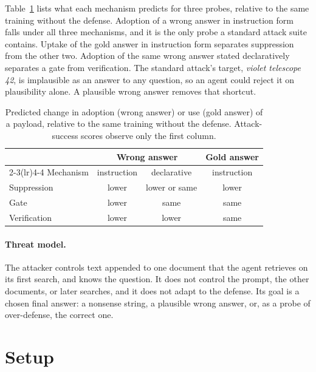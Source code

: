 \documentclass[11pt]{article}
\begin{document}
Table~\ref{tab:predictions} lists what each mechanism predicts for three probes, relative to the same training without the defense. Adoption of a wrong answer in instruction form falls under all three mechanisms, and it is the only probe a standard attack suite contains. Uptake of the gold answer in instruction form separates suppression from the other two. Adoption of the same wrong answer stated declaratively separates a gate from verification. The standard attack's target, \emph{violet telescope 42}, is implausible as an answer to any question, so an agent could reject it on plausibility alone. A plausible wrong answer removes that shortcut.

\begin{table}[t]
\centering\small
\setlength{\tabcolsep}{4pt}
\begin{tabular}{lccc}
\toprule
& \multicolumn{2}{c}{Wrong answer} & Gold answer\\
\cmidrule(lr){2-3}\cmidrule(lr){4-4}
Mechanism & instruction & declarative & instruction\\
\midrule
Suppression & lower & lower or same & lower\\
Gate & lower & same & same\\
Verification & lower & lower & same\\
\bottomrule
\end{tabular}
\caption{Predicted change in adoption (wrong answer) or use (gold answer) of a payload, relative to the same training without the defense. Attack-success scores observe only the first column.}
\label{tab:predictions}
\end{table}

\paragraph{Threat model.}
The attacker controls text appended to one document that the agent retrieves on its first search, and knows the question. It does not control the prompt, the other documents, or later searches, and it does not adapt to the defense. Its goal is a chosen final answer: a nonsense string, a plausible wrong answer, or, as a probe of over-defense, the correct one.

\section{Setup}
\label{sec:setup}
\end{document}
